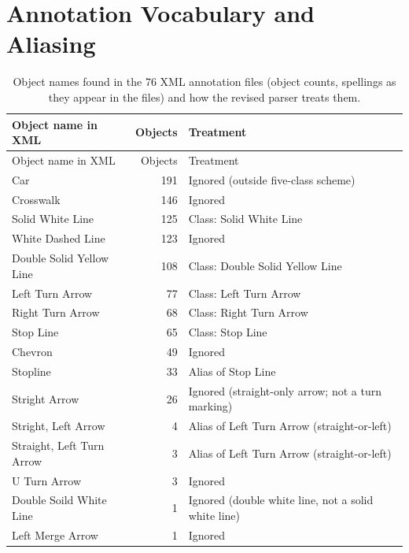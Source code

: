 \documentclass[11pt]{article}
\begin{document}
\section{Annotation Vocabulary and Aliasing}
\setcounter{table}{0}
\begin{longtable}{P{0.34\textwidth} r P{0.44\textwidth}}
\caption{Object names found in the 76 XML annotation files (object counts, spellings as they appear in the files) and how the revised parser treats them.}\label{tab:vocab}\\
\toprule Object name in XML & Objects & Treatment \\
\midrule
\endfirsthead
\toprule Object name in XML & Objects & Treatment \\
\midrule
\endhead
Car & 191 & Ignored (outside five-class scheme) \\
Crosswalk & 146 & Ignored \\
Solid White Line & 125 & Class: Solid White Line \\
White Dashed Line & 123 & Ignored \\
Double Solid Yellow Line & 108 & Class: Double Solid Yellow Line \\
Left Turn Arrow & 77 & Class: Left Turn Arrow \\
Right Turn Arrow & 68 & Class: Right Turn Arrow \\
Stop Line & 65 & Class: Stop Line \\
Chevron & 49 & Ignored \\
Stopline & 33 & Alias of Stop Line \\
Stright Arrow & 26 & Ignored (straight-only arrow; not a turn marking) \\
Stright, Left Arrow & 4 & Alias of Left Turn Arrow (straight-or-left) \\
Straight, Left Turn Arrow & 3 & Alias of Left Turn Arrow (straight-or-left) \\
U Turn Arrow & 3 & Ignored \\
Double Soild White Line & 1 & Ignored (double white line, not a solid white line) \\
Left Merge Arrow & 1 & Ignored \\
\bottomrule
\end{longtable}
\end{document}
